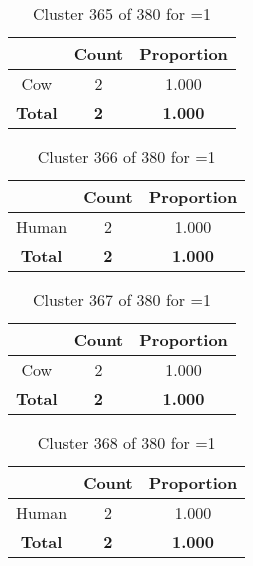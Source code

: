 \begin{table}[ht!]
\centering
\begin{tabular}{|c|c|c|}
\hline
\bf \Spec{} &\bf Count &\bf Proportion\\ \hline \hline
Cow & 2 & 1.000\\ \hline
\hline
\bf Total & \bf 2 & \bf 1.000\\ \hline
\end{tabular}
\label{tab:cluster:365:1}
\caption{Cluster 365 of 380 for \minneigh{}=1}
\end{table}

\begin{table}[ht!]
\centering
\begin{tabular}{|c|c|c|}
\hline
\bf \Spec{} &\bf Count &\bf Proportion\\ \hline \hline
Human & 2 & 1.000\\ \hline
\hline
\bf Total & \bf 2 & \bf 1.000\\ \hline
\end{tabular}
\label{tab:cluster:366:1}
\caption{Cluster 366 of 380 for \minneigh{}=1}
\end{table}

\begin{table}[ht!]
\centering
\begin{tabular}{|c|c|c|}
\hline
\bf \Spec{} &\bf Count &\bf Proportion\\ \hline \hline
Cow & 2 & 1.000\\ \hline
\hline
\bf Total & \bf 2 & \bf 1.000\\ \hline
\end{tabular}
\label{tab:cluster:367:1}
\caption{Cluster 367 of 380 for \minneigh{}=1}
\end{table}

\begin{table}[ht!]
\centering
\begin{tabular}{|c|c|c|}
\hline
\bf \Spec{} &\bf Count &\bf Proportion\\ \hline \hline
Human & 2 & 1.000\\ \hline
\hline
\bf Total & \bf 2 & \bf 1.000\\ \hline
\end{tabular}
\label{tab:cluster:368:1}
\caption{Cluster 368 of 380 for \minneigh{}=1}
\end{table}

